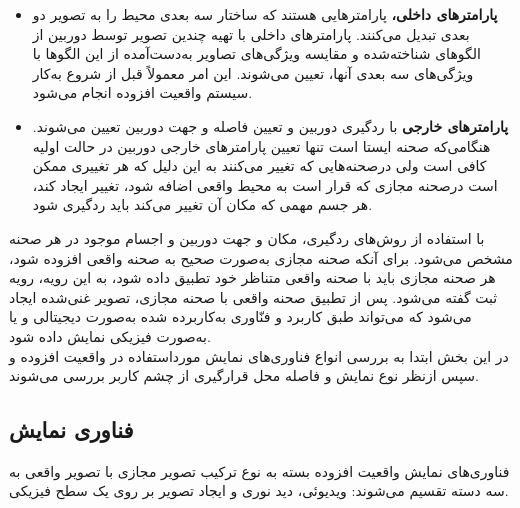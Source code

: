 \begin{itemize}
	\item \textbf{پارامترهای داخلی، }
 پارامترهایی هستند که ساختار سه بعدی محیط را به تصویر دو بعدی تبدیل می‌کنند. پارامترهای داخلی با تهیه چندین تصویر توسط دوربین از الگوهای شناخته‌شده و مقایسه ویژگی‌های تصاویر به‌دست‌آمده از این الگوها با ویژگی‌های سه بعدی آنها، تعیین می‌شوند. این امر معمولاً قبل از شروع به‌کار سیستم واقعیت افزوده انجام می‌شود.
 \item \textbf{پارامترهای خارجی}
   با ردگیری دوربین و تعیین فاصله و جهت دوربین تعیین می‌شوند. هنگامی‌که صحنه ایستا است تنها تعیین پارامترهای خارجی دوربین در حالت اولیه کافی است ولی درصحنه‌هایی که تغییر می‌کنند به این دلیل که هر تغییری ممکن است درصحنه مجازی که قرار است به محیط واقعی اضافه شود، تغییر ایجاد کند، هر جسم مهمی که مکان آن تغییر می‌کند باید ردگیری شود\cite{Billinghurst}.
\end{itemize}
با استفاده از روش‌های ردگیری، مکان و جهت دوربین و اجسام موجود در هر صحنه مشخص می‌شود. برای آنکه صحنه مجازی به‌صورت صحیح به صحنه واقعی افزوده شود، هر صحنه مجازی باید با صحنه واقعی متناظر خود تطبیق داده شود، به این رویه، رویه ثبت گفته می‌شود. پس از تطبیق صحنه واقعی با صحنه مجازی، تصویر غنی‌شده ایجاد می‌شود که می‌تواند طبق کاربرد و فنّاوری به‌کاربرده شده به‌صورت دیجیتالی و یا به‌صورت فیزیکی نمایش داده شود.
\\
در این بخش ابتدا به بررسی انواع فناوری‌های نمایش مورداستفاده در واقعیت افزوده و سپس ازنظر نوع نمایش و فاصله محل قرارگیری از چشم کاربر بررسی می‌شوند.
\subsection{فناوری نمایش}
فناوری‌های نمایش واقعیت افزوده بسته به نوع ترکیب تصویر مجازی با تصویر واقعی به سه دسته تقسیم می‌شوند: ویدیوئی، دید نوری و ایجاد تصویر بر روی یک سطح فیزیکی.
